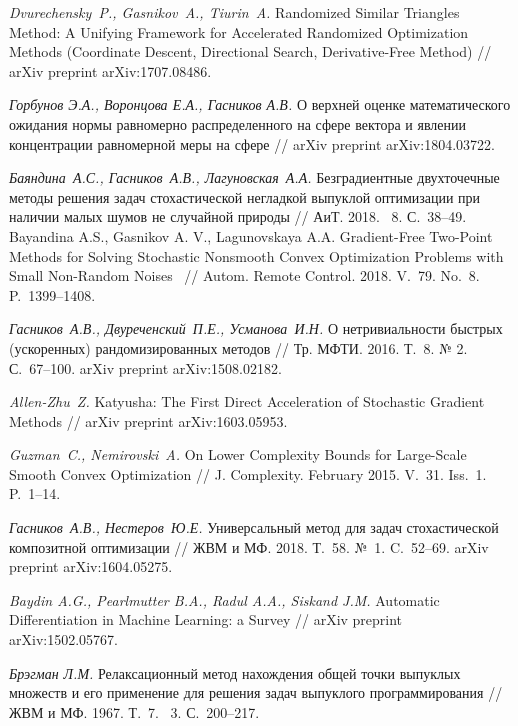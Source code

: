 \documentclass[11pt]{article}
\newcommand*{\No}{\textnumero}
\begin{document}
\begin{thebibliography}{99}
		\textit{Dvurechensky~P., Gasnikov~A., Tiurin~A.}
		Randomized Similar Triangles Method: A Unifying Framework for Accelerated Randomized Optimization Methods (Coordinate Descent, Directional Search, Derivative-Free Method) // 
		arXiv preprint %
		arXiv:1707.08486.
		
		\textit{Горбунов Э.А., Воронцова Е.А., 
		Гасников А.В.}
		О верхней оценке математического ожидания нормы
равномерно распределенного на сфере вектора и
явлении концентрации равномерной меры на сфере // arXiv preprint %
arXiv:1804.03722.
		
		
		\textit{Баяндина~А.С., Гасников~А.В., Лагуновская~А.А.}
		Безградиентные двухточечные методы решения задач стохастической негладкой выпуклой оптимизации при наличии малых шумов не случайной природы // АиТ. 2018. \No~8. С.~38--49. 
Bayandina A.S.,  Gasnikov A. V., Lagunovskaya
A.A.
Gradient-Free Two-Point Methods for Solving Stochastic Nonsmooth Convex Optimization Problems with Small Non-Random Noises
~// Autom. Remote Control. 2018.
		V.~79. No.~8. P.~1399--1408.

		
		\textit{Гасников~А.В., Двуреченский~П.Е., Усманова~И.Н.}
		О нетривиальности быстрых (ускоренных) рандомизированных методов // Тр. МФТИ. 2016. Т.~8. № 2. С.~67--100.
		arXiv preprint %
		arXiv:1508.02182.
		
		\textit{Allen-Zhu~Z.} %
		Katyusha: The First Direct Acceleration of Stochastic Gradient Methods //
		arXiv preprint %
		arXiv:1603.05953.
		
		\textit{Guzman~C., Nemirovski~A.}
		On Lower Complexity Bounds for Large-Scale Smooth Convex Optimization //
		J. Complexity. February 2015. 
		V.~31. Iss.~1. P.~1--14.
		
		\textit{Гасников~А.В., Нестеров~Ю.Е.}
		Универсальный метод для задач стохастической композитной оптимизации // ЖВМ и МФ. 2018. Т.~58. №~1. C.~52--69.
		arXiv preprint %
		arXiv:1604.05275.
		
		\textit{Baydin A.G., Pearlmutter B.A., Radul A.A., Siskand J.M.} Automatic Differentiation in Machine Learning: a Survey // 
		 arXiv preprint %
		 arXiv:1502.05767.
		 
		 \textit{Брэгман Л.М.} Релаксационный метод нахождения общей точки выпуклых множеств
и его применение для решения задач выпуклого программирования // ЖВМ и МФ. 1967. Т.~7. \No~3. С.~200--217.


\end{thebibliography}
\end{document}
